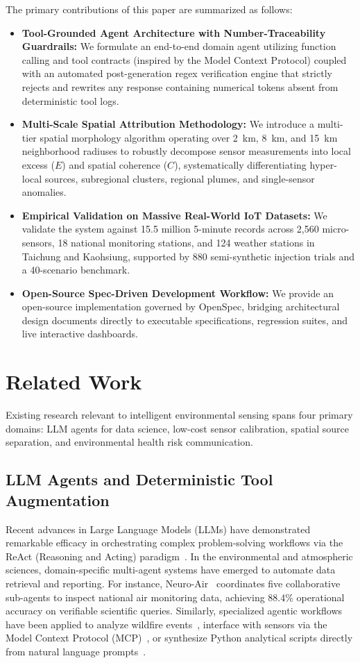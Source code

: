 \documentclass[conference]{IEEEtran}
\begin{document}
The primary contributions of this paper are summarized as follows:
\begin{itemize}
    \item \textbf{Tool-Grounded Agent Architecture with Number-Traceability Guardrails:} We formulate an end-to-end domain agent utilizing function calling and tool contracts (inspired by the Model Context Protocol) coupled with an automated post-generation regex verification engine that strictly rejects and rewrites any response containing numerical tokens absent from deterministic tool logs.
    \item \textbf{Multi-Scale Spatial Attribution Methodology:} We introduce a multi-tier spatial morphology algorithm operating over 2~km, 8~km, and 15~km neighborhood radiuses to robustly decompose sensor measurements into local excess ($E$) and spatial coherence ($C$), systematically differentiating hyper-local sources, subregional clusters, regional plumes, and single-sensor anomalies.
    \item \textbf{Empirical Validation on Massive Real-World IoT Datasets:} We validate the system against 15.5 million 5-minute records across 2,560 micro-sensors, 18 national monitoring stations, and 124 weather stations in Taichung and Kaohsiung, supported by 880 semi-synthetic injection trials and a 40-scenario benchmark.
    \item \textbf{Open-Source Spec-Driven Development Workflow:} We provide an open-source implementation governed by OpenSpec, bridging architectural design documents directly to executable specifications, regression suites, and live interactive dashboards.
\end{itemize}

\section{Related Work}
Existing research relevant to intelligent environmental sensing spans four primary domains: LLM agents for data science, low-cost sensor calibration, spatial source separation, and environmental health risk communication.

\subsection{LLM Agents and Deterministic Tool Augmentation}
Recent advances in Large Language Models (LLMs) have demonstrated remarkable efficacy in orchestrating complex problem-solving workflows via the ReAct (Reasoning and Acting) paradigm~\cite{s_035}. In the environmental and atmospheric sciences, domain-specific multi-agent systems have emerged to automate data retrieval and reporting. For instance, Neuro-Air~\cite{s_053} coordinates five collaborative sub-agents to inspect national air monitoring data, achieving 88.4\% operational accuracy on verifiable scientific queries. Similarly, specialized agentic workflows have been applied to analyze wildfire events~\cite{s_054}, interface with sensors via the Model Context Protocol (MCP)~\cite{s_036}, or synthesize Python analytical scripts directly from natural language prompts~\cite{s_037}. 
\end{document}
